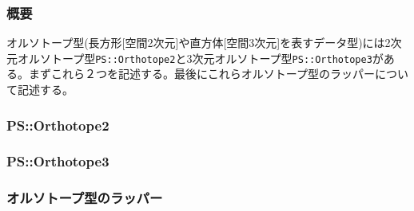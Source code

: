 \subsubsection{概要}

オルソトープ型(長方形[空間2次元]や直方体[空間3次元]を表すデータ型)には2次元オルソトープ型\texttt{PS::Orthotope2}と3次元オルソトープ型\texttt{PS::Orthotope3}がある。まずこれら２つを記述する。最後にこれらオルソトープ型のラッパーについて記述する。

\subsubsection{PS::Orthotope2}



\subsubsection{PS::Orthotope3}



\subsubsection{オルソトープ型のラッパー}



